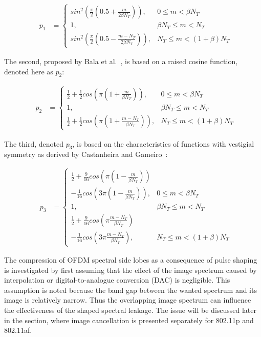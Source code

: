 \begin{eqnarray}
\label{p1m}
&p_1 &=\begin{cases}	sin^2( \frac{\pi}{2}(0.5+\frac{m}{2\beta N_{T}}) ), 			& 0 \leq m < \beta N_{T} \\
					 	1, 															& \beta N_{T} \leq m < N_{T}  \\
					 	sin^2( \frac{\pi}{2}(0.5-\frac{m-N_{T}}{2\beta N_{T}}) ), 	& N_{T} \leq m < (1+\beta)N_{T} \end{cases}
\end{eqnarray}


The second, proposed by Bala et al.~\cite{Bala2013}, is based on a raised cosine function, denoted here as $p_2$:


\begin{eqnarray}
\label{p2m}
&p_2 &=\begin{cases}	\frac{1}{2}+\frac{1}{2}cos(\pi(1+\frac{m}{\beta N_{T}})), 			&0\leq m<\beta N_{T} \\
					 	1, 																	&\beta N_{T}\leq m < N_{T}  \\
					 	\frac{1}{2}+\frac{1}{2}cos(\pi(1+\frac{m-N_{T}}{\beta N_{T}})),		& N_{T}\leq m<(1+\beta)N_{T} \end{cases}
\end{eqnarray}


The third, denoted $p_3$, is based on the characteristics of functions with vestigial symmetry as derived by Castanheira and Gameiro~\cite{Castanheira2013}:

\begin{eqnarray}
\label{p3m}
&p_3 &=\begin{cases}	\frac{1}{2}+\frac{9}{16}cos( \pi(1 - \frac{m}{\beta N_{T}}) ) & \\
						- \frac{1}{16}cos(3\pi(1 - \frac{m}{\beta N_{T}}) ), 					& 0 \leq m < \beta N_{T} \\
					 	1, 																	& \beta N_{T} \leq m < N_{T}  \\
					 	\frac{1}{2}+\frac{9}{16}cos( \pi \frac{m-N_{T}}{\beta N_{T}}) &\\
						-\frac{1}{16}cos(3\pi \frac{m-N_{T}}{\beta N_{T}}),					&  N_{T} \leq m < (1+\beta)N_{T} \end{cases}
\end{eqnarray}


The compression of OFDM spectral side lobes as a consequence of pulse shaping is investigated by first assuming that the effect of the image spectrum caused by interpolation or digital-to-analogue conversion (DAC) is negligible.
This assumption is noted because the band gap between the wanted spectrum and its image is relatively narrow.
Thus the overlapping image spectrum can influence the effectiveness of the shaped spectral leakage.
The issue will be discussed later in the section, where image cancellation is presented separately for 802.11p and 802.11af.

